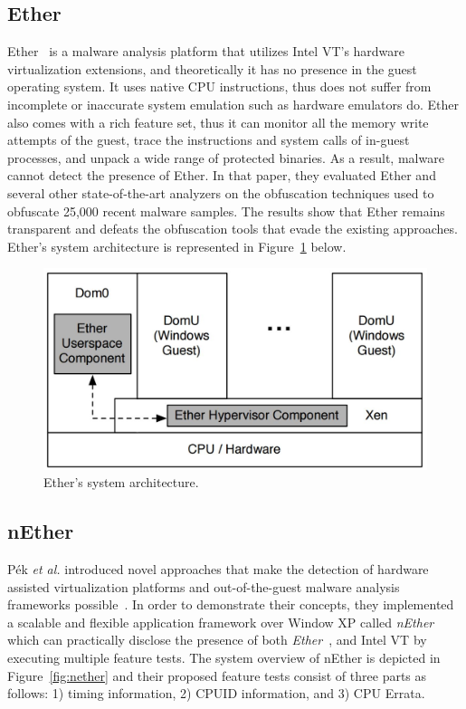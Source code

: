 \subsection{Ether}
Ether~\cite{ether} is a malware analysis platform that utilizes 
Intel VT's hardware virtualization extensions, and theoretically it has no presence 
in the guest operating system. It uses native CPU instructions, thus does not suffer from 
incomplete or inaccurate system emulation such as hardware emulators do. 
Ether also comes with a rich feature set, thus it can monitor 
all the memory write attempts of the guest, trace the instructions and 
system calls of in-guest processes, and unpack a wide range of protected binaries. 
As a result, malware cannot detect the presence of Ether. In that paper, 
they evaluated Ether and several other state-of-the-art analyzers on the obfuscation techniques 
used to obfuscate 25,000 recent malware samples. The results show that Ether remains transparent 
and defeats the obfuscation tools that evade the existing approaches. 
Ether's system architecture is represented in Figure~\ref{fig:ether} below.

\begin{figure}[!h]
	\centering
	\includegraphics[width=\linewidth]{figure/ether.png}
	\caption{Ether's system architecture.}
	\label{fig:ether}
\end{figure}

\subsection{nEther}
P{\'e}k \textit{et al.} introduced novel approaches that make the detection of 
hardware assisted virtualization platforms and out-of-the-guest 
malware analysis frameworks possible~\cite{nether}. In order to demonstrate their concepts, 
they implemented a scalable and flexible application framework over Window XP 
called \textit{nEther} which can practically disclose the presence of both 
\textit{Ether}~\cite{ether}, and Intel VT by executing multiple feature tests. 
The system overview of nEther is depicted in Figure~\ref{fig:nether} and 
their proposed feature tests consist of three parts as follows: 1) timing information, 
2) CPUID information, and 3) CPU Errata. 

